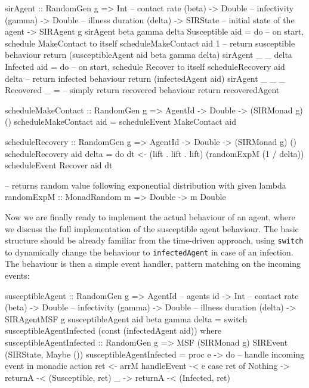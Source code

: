 \begin{HaskellCode}
sirAgent :: RandomGen g 
         => Int         -- contact rate (beta)
         -> Double      -- infectivity (gamma)
         -> Double      -- illness duration (delta)
         -> SIRState    -- initial state of the agent
         -> SIRAgent g
sirAgent beta gamma delta Susceptible aid = do
  -- on start, schedule MakeContact to itself
  scheduleMakeContact aid 1
  -- return susceptible behaviour
  return (susceptibleAgent aid beta gamma delta)
sirAgent _ _ delta Infected aid = do
  -- on start, schedule Recover to itself
  scheduleRecovery aid delta
  -- return infected behaviour
  return (infectedAgent aid)
sirAgent _ _ _ Recovered _ = 
  -- simply return recovered behaviour
  return recoveredAgent

scheduleMakeContact :: RandomGen g => AgentId -> Double -> (SIRMonad g) ()
scheduleMakeContact aid = scheduleEvent MakeContact aid

scheduleRecovery :: RandomGen g => AgentId -> Double -> (SIRMonad g) ()
scheduleRecovery aid delta = do
  dt <- (lift . lift . lift) (randomExpM (1 / delta))
  scheduleEvent Recover aid dt

-- returns random value following exponential distribution with given lambda
randomExpM :: MonadRandom m => Double -> m Double
\end{HaskellCode}

Now we are finally ready to implement the actual behaviour of an agent, where we discuss the full implementation of the susceptible agent behaviour. The basic structure should be already familiar from the time-driven approach, using \texttt{switch} to dynamically change the behaviour to \texttt{infectedAgent} in case of an infection. The behaviour is then a simple event handler, pattern matching on the incoming events:

\begin{HaskellCode}
susceptibleAgent :: RandomGen g 
                 => AgentId        -- agents id
                 -> Int            -- contact rate (beta)
                 -> Double         -- infectivity (gamma)
                 -> Double         -- illness duration (delta)
                 -> SIRAgentMSF g
susceptibleAgent aid beta gamma delta = 
    switch susceptibleAgentInfected (const (infectedAgent aid))
  where
    susceptibleAgentInfected :: RandomGen g 
                             => MSF (SIRMonad g) SIREvent (SIRState, Maybe ()) 
    susceptibleAgentInfected = proc e -> do
      -- handle incoming event in monadic action
      ret <- arrM handleEvent -< e
      case ret of
        Nothing -> returnA -< (Susceptible, ret)
        _       -> returnA -< (Infected, ret)
\end{HaskellCode}

